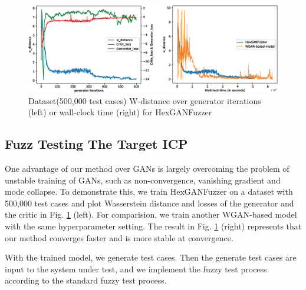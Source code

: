 
\begin{figure}[t] 		 %
	\centering
	\includegraphics[width=\textwidth]{Figure/FigModelW-distance.eps}
	\caption{Dataset(500,000 test cases) W-distance over generator iterations (left) or wall-clock time (right) for HexGANFuzzer}
	\label{FigModelW-distance}
\end{figure} 

\subsection{Fuzz Testing The Target ICP}
One advantage of our method over GANs is largely overcoming the problem of unstable training of GANs, such as non-convergence, vanishing gradient and mode collapse. %
To demonstrate this, we train HexGANFuzzer on a dataset with 500,000 test cases and plot Wasserstein distance and losses of the generator and the critic in Fig. \ref{FigModelW-distance} (left). For comparision, we train another WGAN-based model with the same hyperparameter setting. The result in Fig. \ref{FigModelW-distance} (right) represents that our method converges faster and is more stable at convergence.

With the trained model, we generate test cases. Then the generate test cases are input to the system under test, and we implement the fuzzy test process according to the standard fuzzy test process.



